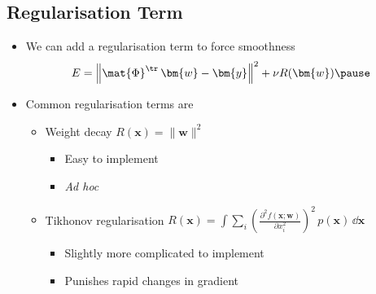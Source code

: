 \begin{slide}
\section[-1.5]{Regularisation Term}

\begin{PauseHighLight}

\begin{itemize}
\item We can add a regularisation term to force smoothness
  \begin{displaymath}
    E = \left\|\strut \mat{\Phi}^\tr \, \bm{w}-\bm{y} \right\|^2 + \nu
    R(\bm{w})\pause 
  \end{displaymath}
\item Common regularisation terms are
  \begin{itemize}
  \item Weight decay $R(\bm{x})=\|\bm{w}\|^2$
    \begin{itemize}
    \item Easy to implement
    \item \textit{Ad hoc}\pause
    \end{itemize}
  \item Tikhonov regularisation $R(\bm{x})=\int \sum_i \left(\frac{\partial^2
        f(\bm{x};\bm{w})}{\partial x_i^2}\right)^2\, p(\bm{x}) \, \dd \bm{x}$
    \begin{itemize}
    \item Slightly more complicated to implement
    \item Punishes rapid changes in gradient\pause
    \end{itemize}
  \end{itemize}
\end{itemize}

\end{PauseHighLight}
\end{slide}


